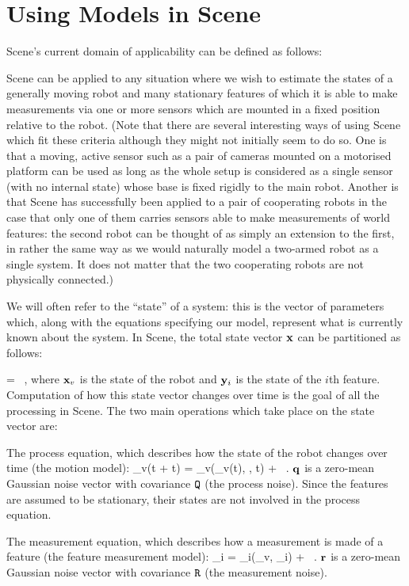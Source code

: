 \documentclass{article}
\begin{document}
\section{Using Models in Scene}

Scene's current domain of applicability can be defined as follows:
\bi
\item Scene can be applied to any situation where we wish to estimate the
states of a generally moving robot and many stationary features of
which it is able to make measurements via one or more sensors which
are mounted in a fixed position relative to the robot.
\ei
(Note that there are several interesting ways of using Scene which fit
these criteria although they might not initially seem to do so. One is
that a moving, active sensor such as a pair of cameras mounted on a
motorised platform can be used as long as the whole setup is
considered as a single sensor (with no internal state) whose base is
fixed rigidly to the main robot. Another is that Scene has
successfully been applied to a pair of cooperating robots in the case
that only one of them carries sensors able to make measurements of
world features: the second robot can be thought of as simply an
extension to the first, in rather the same way as we would naturally
model a two-armed robot as a single system. It does not
matter that the two cooperating robots are not physically connected.)


We will often refer to the ``state'' of a system: this is the vector
of parameters which, along with the equations specifying our model,
represent what is currently known about the system. In Scene,
the total state vector ${{\bf x}}$ can be partitioned as follows:

\beq
\vecx = 
~, 
\eeq
where ${{\bf x}}_v$ is the state of the robot and ${{\bf y}}_i$ is the state
of the $i$th feature. Computation of how this state vector changes
over time is the goal of all the processing in Scene. The two main
operations which take place on the state vector are:
\be
\item The process equation, which describes how the state of the robot
changes over time (the motion model):
\beq
\vecx_v(t + \Delta t) = \vecf_v(\vecx_v(t), \vecu, \Delta t) + \vecq~.
\eeq
${{\bf q}}$ is a zero-mean Gaussian noise vector with covariance ${{\tt Q}}$
(the process noise).
Since the features are assumed to be stationary, their states are not
involved in the process equation. 

\item The measurement equation, which describes how a measurement is
made of a feature (the feature measurement model):
\beq
\vecz_i = \vech_i(\vecx_v, \vecy_i) + \vecr~.
\eeq
${{\bf r}}$ is a zero-mean Gaussian noise vector with covariance ${{\tt R}}$
(the measurement noise).
\ee
\end{document}
